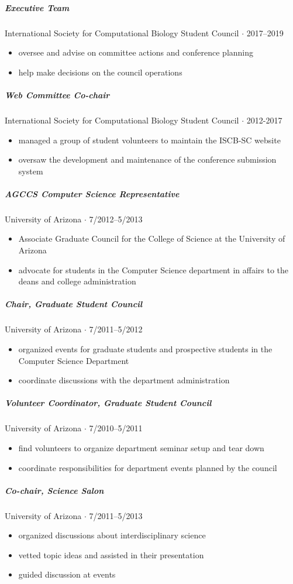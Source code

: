 \documentclass[10pt,letterpaper]{article}
\newcommand{\bigdot}{$\cdot$\xspace}
\begin{document}
\subparagraph{Executive Team}
International Society for Computational Biology Student Council \bigdot 2017--2019
\begin{itemize} 
    \item oversee and advise on committee actions and conference planning 
    \item help make decisions on the council operations
\end{itemize}

\subparagraph{Web Committee Co-chair}
International Society for Computational Biology Student Council  \bigdot 2012-2017
\begin{itemize}
    \item managed a group of student volunteers to maintain the ISCB-SC website
    \item oversaw the development and maintenance of the conference submission system
\end{itemize}

\subparagraph{AGCCS Computer Science Representative}
University of Arizona \bigdot 7/2012--5/2013
\begin{itemize}
    \item Associate Graduate Council for the College of Science at the University of Arizona
    \item advocate for students in the Computer Science department in affairs to the deans and college administration
\end{itemize}

\subparagraph{Chair, Graduate Student Council}
University of Arizona \bigdot 7/2011--5/2012
\begin{itemize}
    \item organized events for graduate students and prospective students in the Computer Science Department
    \item coordinate discussions with the department administration
\end{itemize}

\subparagraph{Volunteer Coordinator, Graduate Student Council}
University of Arizona \bigdot 7/2010--5/2011
\begin{itemize}
    \item find volunteers to organize department seminar setup and tear down
    \item coordinate responsibilities for department events planned by the council
\end{itemize}

\subparagraph{Co-chair, Science Salon}
University of Arizona \bigdot 7/2011--5/2013
\begin{itemize}
    \item organized discussions about interdisciplinary science
    \item vetted topic ideas and assisted in their presentation
    \item guided discussion at events
\end{itemize}
\end{document}
